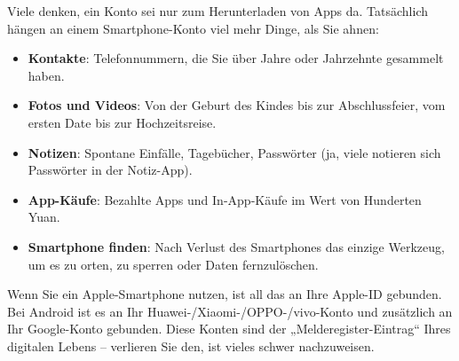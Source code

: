 


Viele denken, ein Konto sei nur zum Herunterladen von Apps da. Tatsächlich hängen an einem Smartphone-Konto viel mehr Dinge, als Sie ahnen:

\begin{itemize}
  \item \textbf{Kontakte}: Telefonnummern, die Sie über Jahre oder Jahrzehnte gesammelt haben.
  \item \textbf{Fotos und Videos}: Von der Geburt des Kindes bis zur Abschlussfeier, vom ersten Date bis zur Hochzeitsreise.
  \item \textbf{Notizen}: Spontane Einfälle, Tagebücher, Passwörter (ja, viele notieren sich Passwörter in der Notiz-App).
  \item \textbf{App-Käufe}: Bezahlte Apps und In-App-Käufe im Wert von Hunderten Yuan.
  \item \textbf{Smartphone finden}: Nach Verlust des Smartphones das einzige Werkzeug, um es zu orten, zu sperren oder Daten fernzulöschen.
\end{itemize}

Wenn Sie ein Apple-Smartphone nutzen, ist all das an Ihre Apple-ID gebunden. Bei Android ist es an Ihr Huawei-/Xiaomi-/OPPO-/vivo-Konto und zusätzlich an Ihr Google-Konto gebunden. Diese Konten sind der „Melderegister-Eintrag“ Ihres digitalen Lebens – verlieren Sie den, ist vieles schwer nachzuweisen.


